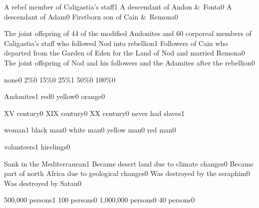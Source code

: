 
{A rebel member of Caligastia's staff}{1}
{A descendant of Andon \&\ Fonta}{0}
{A descendant of Adam}{0}
{Firstborn son of Cain \&\ Remona}{0}
\qstop

{The joint offspring of 44 of the modified Andonites and 60 corporeal members of Caligastia's staff who followed Nod into rebellion}{1}
{Followers of Cain who departed from the Garden of Eden for the Land of Nod and married Remona}{0}
{The joint offspring of Nod and his followers and the Adamites after the rebellion}{0}
\qstop


{none}{0}
{2\%}{0}
{15\%}{0}
{25\%}{1}
{50\%}{0}
{100\%}{0}
\qstop

{Andonites}{1}
{red}{0}
{yellow}{0}
{orange}{0}
\qstop


{XV century}{0}
{XIX century}{0}
{XX century}{0}
{never had slaves}{1}
\qstop

{woman}{1}
{black man}{0}
{white man}{0}
{yellow man}{0}
{red man}{0}
\qstop





{volunteers}{1}
{hirelings}{0}
\qstop

{Sank in the Mediterranean}{1}
{Became desert land due to climate changes}{0}
{Became part of north Africa due to geological changes}{0}
{Was destroyed by the seraphim}{0}
{Was destroyed by Satan}{0}
\qstop

{500,000 persons}{1}
{100 persons}{0}
{1,000,000 persons}{0}
{40 persons}{0}
\qstop

